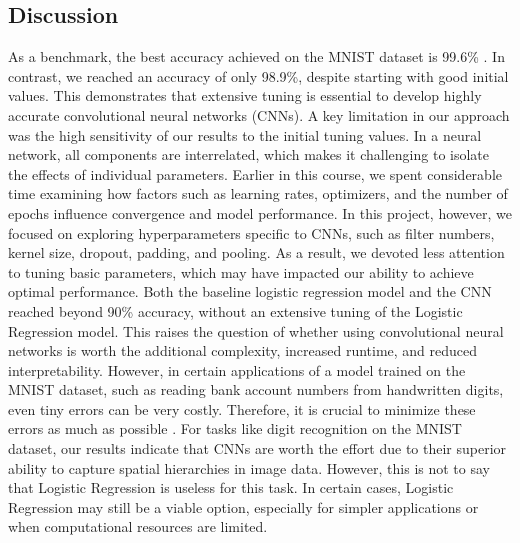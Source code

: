 \subsection{Discussion}
As a benchmark, the best accuracy achieved on the MNIST dataset is 99.6\% \cite{simard2003mnist}. In contrast, we reached an accuracy of only 98.9\%, despite starting with good initial values. This demonstrates that extensive tuning is essential to develop highly accurate convolutional neural networks (CNNs). A key limitation in our approach was the high sensitivity of our results to the initial tuning values. In a neural network, all components are interrelated, which makes it challenging to isolate the effects of individual parameters.
\newline
\newline
Earlier in this course, we spent considerable time examining how factors such as learning rates, optimizers, and the number of epochs influence convergence and model performance. In this project, however, we focused on exploring hyperparameters specific to CNNs, such as filter numbers, kernel size, dropout, padding, and pooling. As a result, we devoted less attention to tuning basic parameters, which may have impacted our ability to achieve optimal performance.
\newline
\newline
Both the baseline logistic regression model and the CNN reached beyond 90\% accuracy, without an extensive tuning of the Logistic Regression model. This raises the question of whether using convolutional neural networks is worth the additional complexity, increased runtime, and reduced interpretability. However, in certain applications of a model trained on the MNIST dataset, such as reading bank account numbers from handwritten digits, even tiny errors can be very costly. Therefore, it is crucial to minimize these errors as much as possible \cite{raschka2022machine}. 
\newline
\newline
For tasks like digit recognition on the MNIST dataset, our results indicate that CNNs are worth the effort due to their superior ability to capture spatial hierarchies in image data. However, this is not to say that Logistic Regression is useless for this task. In certain cases, Logistic Regression may still be a viable option, especially for simpler applications or when computational resources are limited. 
